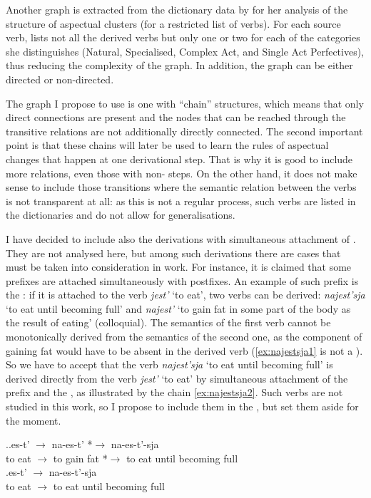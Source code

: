 Another graph is extracted from the dictionary data by \citet{Janda:07a} for her analysis of the structure of aspectual clusters (for a restricted list of verbs). For each source verb, \citeauthor{Janda:07a} lists not all the derived verbs but only one or two for each of the categories she distinguishes (Natural, Specialised, Complex Act, and Single Act Perfectives), thus reducing the complexity of the graph. In addition, the graph can be either directed or non-directed. 
 
The graph I propose to use is one with ``chain'' structures, which means that only direct connections are present and the nodes that can be reached through the transitive relations are not additionally directly connected. The second important point is that these chains will later be used to learn the rules of aspectual changes that happen at one derivational step. That is why it is good to include more relations, even those with non- steps. On the other hand, it does not make sense to include those transitions where the semantic relation between the verbs is not transparent at all: as this is not a regular process, such verbs are listed in the dictionaries and do not allow for generalisations. 

I have decided to include also the derivations with simultaneous attachment of . They are not analysed here, but among such derivations there are cases that must be taken into consideration in  work. For instance, it is claimed that some prefixes are attached simultaneously with postfixes. An example of such prefix is the  : if it is attached to the verb \textit{jest'} `to eat', two verbs can be derived: \textit{najest'sja} `to eat until becoming full' and \textit{najest'} `to gain fat in some part of the body as the result of eating' (colloquial). The semantics of the first verb cannot be  monotonically derived from the semantics of the second one, as the component of gaining fat would have to be absent in the derived verb (\ref{ex:najestsja1} is not a ). So we have to accept that the verb \textit{najest'sja} `to eat until becoming full' is derived directly from the verb \textit{jest'} `to eat' by simultaneous attachment of the prefix and the , as illustrated by the chain \ref{ex:najestsja2}. Such verbs are not studied in this work, so I propose to include them in the , but set them aside for the moment.
 
 \ex.\label{ex:najestsja}\ag.\label{ex:najestsja1}es-t'\textsuperscript{\IPF} $\rightarrow$ na-es-t'\textsuperscript{\PF} *$\rightarrow$ na-es-t'-sja\textsuperscript{\PF}\\	
{to eat} $\rightarrow$ {to gain fat} *$\rightarrow$ {to eat until becoming full}\\
\bg.\label{ex:najestsja2}es-t'\textsuperscript{\PF} $\rightarrow$ na-es-t'-sja\textsuperscript{\PF}\\
{to eat} $\rightarrow$ {to eat until becoming full}\\

